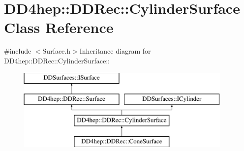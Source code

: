 \hypertarget{class_d_d4hep_1_1_d_d_rec_1_1_cylinder_surface}{
\section{DD4hep::DDRec::CylinderSurface Class Reference}
\label{class_d_d4hep_1_1_d_d_rec_1_1_cylinder_surface}
}


{\ttfamily \#include $<$Surface.h$>$}Inheritance diagram for DD4hep::DDRec::CylinderSurface::\begin{figure}[H]
\begin{center}
\leavevmode
\includegraphics[height=4cm]{class_d_d4hep_1_1_d_d_rec_1_1_cylinder_surface}
\end{center}
\end{figure}
